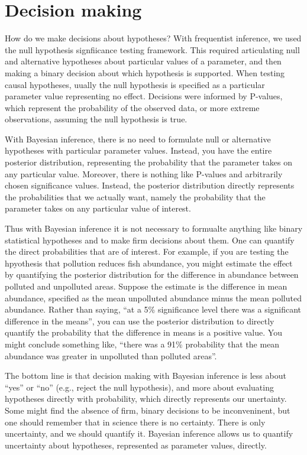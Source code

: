 \documentclass[
]{book}
\begin{document}
\section{Decision making}\label{decision-making}

How do we make decisions about hypotheses? With frequentist inference, we used the null hypothesis signfiicance testing framework. This required articulating null and alternative hypotheses about particular values of a parameter, and then making a binary decision about which hypothesis is supported. When testing causal hypotheses, uually the null hypothesis is specified as a particular parameter value representing no effect. Decisions were informed by P-values, which represent the probability of the observed data, or more extreme observations, assuming the null hypothesis is true.

With Bayesian inference, there is no need to formulate null or alternative hypotheses with particular parameter values. Instead, you have the entire posterior distribution, representing the probability that the parameter takes on any particular value. Moreover, there is nothing like P-values and arbitrarily chosen significance values. Instead, the posterior distribution directly represents the probabilities that we actually want, namely the probability that the parameter takes on any particular value of interest.

Thus with Bayesian inference it is not necessary to formualte anything like binary statistical hypotheses and to make firm decisions about them. One can quantify the direct probabilities that are of interest. For example, if you are testing the hpyothesis that pollution reduces fish abundance, you might estimate the effect by quantifying the posterior distribution for the difference in abundance between polluted and unpolluted areas. Suppose the estimate is the difference in mean abundance, specified as the mean unpolluted abundance minus the mean polluted abundance. Rather than saying, ``at a 5\% significance level there was a significant difference in the means'', you can use the posterior distribution to directly quantify the probability that the difference in means is a positive value. You might conclude something like, ``there was a 91\% probability that the mean abundance was greater in unpolluted than polluted areas''.

The bottom line is that decision making with Bayesian inference is less about ``yes'' or ``no'' (e.g., reject the null hypothesis), and more about evaluating hypotheses directly with probability, which directly represents our unertainty. Some might find the absence of firm, binary decisions to be inconveninent, but one should remember that in science there is no certainty. There is only uncertainty, and we should quantify it. Bayesian inference allows us to quantify uncertainty about hypotheses, represented as parameter values, directly.
\end{document}
